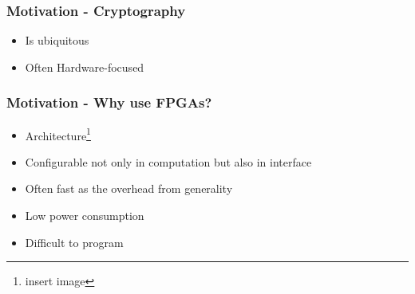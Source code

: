 \begin{frame}
  \frametitle{Motivation - Cryptography}
  \begin{itemize}
    \item Is ubiquitous
    \item Often Hardware-focused
  \end{itemize}
\end{frame}

\begin{frame}
  \frametitle{Motivation - Why use FPGAs?}
  \begin{itemize}
    \item Architecture\footnote{insert image}
    \item Configurable not only in computation but also in interface
    \item Often fast as the overhead from generality
    \item Low power consumption
    \item Difficult to program
  \end{itemize}
\end{frame}
